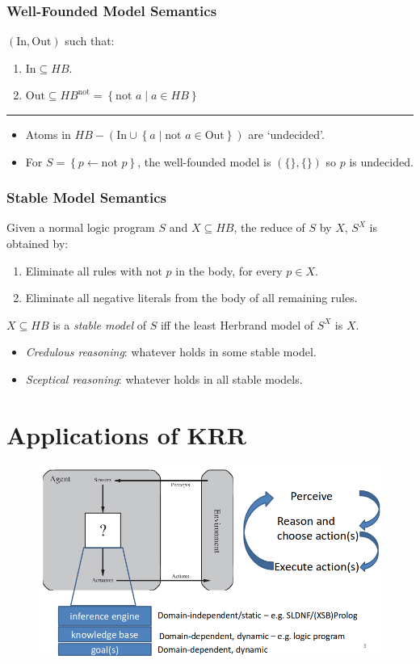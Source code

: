\documentclass[twocolumn,english]{article}
\begin{document}
\subsubsection{Well-Founded Model Semantics}

$\left(\text{In},\text{Out}\right)$ such that:
\begin{enumerate}
\item $\text{In}\subseteq HB$.
\item $\text{Out}\subseteq HB^{\text{not}}=\left\{ \text{not }a\mid a\in HB\right\} $
\end{enumerate}
\rule[0.5ex]{0.25\columnwidth}{0.5pt}
\begin{itemize}
\item Atoms in $HB-\left(\text{In}\cup\left\{ a\mid\text{not }a\in\text{Out}\right\} \right)$
are `undecided'.
\item For $S=\left\{ p\leftarrow\text{not }p\right\} $, the well-founded
model is $\left(\{\},\{\}\right)$ so $p$ is undecided.
\end{itemize}

\subsubsection{Stable Model Semantics}

Given a normal logic program $S$ and $X\subseteq HB$, the reduce
of $S$ by $X$, $S^{X}$ is obtained by:
\begin{enumerate}
\item Eliminate all rules with $\text{not }p$ in the body, for every $p\in X$.
\item Eliminate all negative literals from the body of all remaining rules.
\end{enumerate}
$X\subseteq HB$ is a \emph{stable model} of $S$ iff the least Herbrand
model of $S^{X}$ is $X$. 
\begin{itemize}
\item \emph{Credulous reasoning}: whatever holds in some stable model.
\item \emph{Sceptical reasoning}: whatever holds in all stable models.
\end{itemize}

\section{Applications of KRR}

\begin{figure}[H]
\centering{}\includegraphics[width=0.75\columnwidth]{img/krr-applications}
\end{figure}
\end{document}
